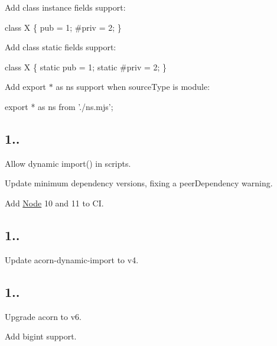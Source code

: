 \begin{DoxyItemize}
\item Add class instance fields support\+: 
\begin{DoxyCode}
class X \{
  pub = 1;
  #priv = 2;
\}
\end{DoxyCode}

\item Add class static fields support\+: 
\begin{DoxyCode}
class X \{
  static pub = 1;
  static #priv = 2;
\}
\end{DoxyCode}

\item Add {\ttfamily export $\ast$ as ns} support when {\ttfamily source\+Type} is \textquotesingle{}module\textquotesingle{}\+: 
\begin{DoxyCode}
export * as ns from './ns.mjs';
\end{DoxyCode}

\end{DoxyItemize}

\subsection*{1..}


\begin{DoxyItemize}
\item Allow dynamic {\ttfamily import()} in scripts.
\item Update minimum dependency versions, fixing a peer\+Dependency warning.
\item Add \mbox{\hyperlink{classNode}{Node}} 10 and 11 to CI.
\end{DoxyItemize}

\subsection*{1..}


\begin{DoxyItemize}
\item Update acorn-\/dynamic-\/import to v4.
\end{DoxyItemize}

\subsection*{1..}


\begin{DoxyItemize}
\item Upgrade acorn to v6.
\item Add bigint support.
\end{DoxyItemize}

